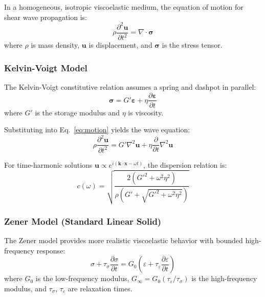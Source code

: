\documentclass[journal,twoside,a4paper]{IEEEtran}
\begin{document}
In a homogeneous, isotropic viscoelastic medium, the equation of motion 
for shear wave propagation is:
\begin{equation}
    \rho \frac{\partial^2 \mathbf{u}}{\partial t^2} = \nabla \cdot \boldsymbol{\sigma}
    \label{eq:motion}
\end{equation}
where $\rho$ is mass density, $\mathbf{u}$ is displacement, and 
$\boldsymbol{\sigma}$ is the stress tensor.

\subsubsection{Kelvin-Voigt Model}

The Kelvin-Voigt constitutive relation assumes a spring and dashpot 
in parallel:
\begin{equation}
    \boldsymbol{\sigma} = G' \boldsymbol{\varepsilon} + \eta \frac{\partial \boldsymbol{\varepsilon}}{\partial t}
    \label{eq:kelvin_voigt}
\end{equation}
where $G'$ is the storage modulus and $\eta$ is viscosity.

Substituting into Eq.~\ref{eq:motion} yields the wave equation:
\begin{equation}
    \rho \frac{\partial^2 \mathbf{u}}{\partial t^2} = G' \nabla^2 \mathbf{u} + \eta \frac{\partial}{\partial t} \nabla^2 \mathbf{u}
    \label{eq:wave_kv}
\end{equation}

For time-harmonic solutions $\mathbf{u} \propto e^{i(\mathbf{k}\cdot\mathbf{x} - \omega t)}$, 
the dispersion relation is:
\begin{equation}
    c(\omega) = \sqrt{\frac{2(G'^2 + \omega^2\eta^2)}{\rho(G' + \sqrt{G'^2 + \omega^2\eta^2})}}
    \label{eq:dispersion_kv}
\end{equation}

\subsubsection{Zener Model (Standard Linear Solid)}

The Zener model provides more realistic viscoelastic behavior with 
bounded high-frequency response:
\begin{equation}
    \sigma + \tau_\sigma \frac{\partial \sigma}{\partial t} = G_0 \left(\varepsilon + \tau_\varepsilon \frac{\partial \varepsilon}{\partial t}\right)
    \label{eq:zener}
\end{equation}
where $G_0$ is the low-frequency modulus, $G_\infty = G_0(\tau_\varepsilon/\tau_\sigma)$ 
is the high-frequency modulus, and $\tau_\sigma$, $\tau_\varepsilon$ are 
relaxation times.
\end{document}
